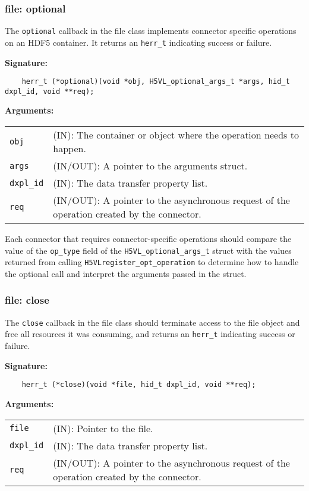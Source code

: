 \subsubsection{file: optional}
The \texttt{optional} callback in the file class implements connector specific operations on an HDF5 container. It returns an 
\texttt{herr\_t} indicating success or failure. \bigskip
\begin{mdframed}[style=bgbox] 
\textbf{Signature:}
\begin{lstlisting}
    herr_t (*optional)(void *obj, H5VL_optional_args_t *args, hid_t dxpl_id, void **req);
\end{lstlisting}

\textbf{Arguments:}\\
\begin{tabular}{l p{13.5cm}}
  \texttt{obj} & (IN): The container or object where the operation needs to happen.\\
  \texttt{args} & (IN/OUT): A pointer to the arguments struct.\\
  \texttt{dxpl\_id} & (IN): The data transfer property list.\\
  \texttt{req} & (IN/OUT): A pointer to the asynchronous request of the operation created by the connector.\\
\end{tabular}
\end{mdframed}

Each connector that requires connector-specific operations should compare the
value of the {\tt op\_type} field of the {\tt H5VL\_optional\_args\_t} struct
with the values returned from calling {\tt H5VLregister\_opt\_operation} to
determine how to handle the optional call and interpret the arguments passed
in the struct.

\subsubsection{file: close}
The \texttt{close} callback in the file class should terminate access to
the file object and free all resources it was consuming, and returns
an \texttt{herr\_t} indicating success or failure.\bigskip\bigskip

\begin{mdframed}[style=bgbox]
\textbf{Signature:}
\begin{lstlisting}
    herr_t (*close)(void *file, hid_t dxpl_id, void **req);
\end{lstlisting}

\textbf{Arguments:}\\
\begin{tabular}{l p{13.5cm}}
  \texttt{file} & (IN): Pointer to the file.\\
  \texttt{dxpl\_id} & (IN): The data transfer property list.\\
  \texttt{req} & (IN/OUT): A pointer to the asynchronous request of the
  operation created by the connector.\\
\end{tabular}
\end{mdframed}

